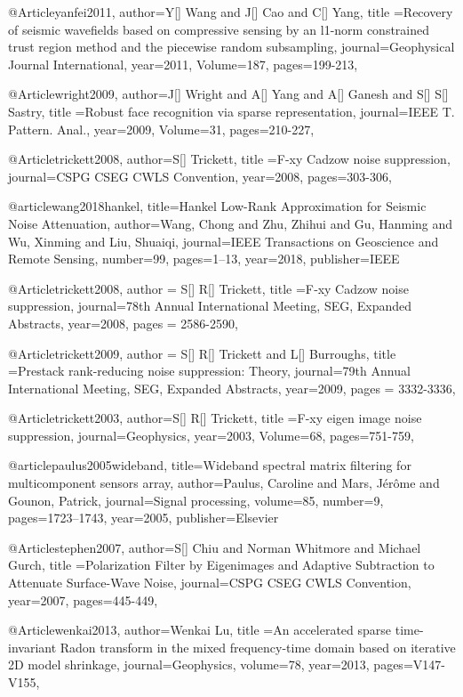 @Article{yanfei2011,
  author={Y[] Wang and J[] Cao and C[] Yang},
  title ={Recovery of seismic wavefields based on compressive sensing by an l1-norm constrained trust region method and the piecewise random subsampling},
  journal={Geophysical Journal International},
  year=2011,
  Volume=187,
  pages={199-213},
}

@Article{wright2009,
  author={J[] Wright and A[] Yang and A[] Ganesh and S[] S[] Sastry},
  title ={Robust face recognition via sparse representation},
  journal={IEEE T. Pattern. Anal.},
  year=2009,
  Volume=31,
  pages={210-227},
}

@Article{trickett2008,
  author={S[] Trickett},
  title ={{F}-xy Cadzow noise suppression},
  journal={CSPG CSEG CWLS Convention},
  year=2008,
  pages={303-306},
}

@article{wang2018hankel,
  title={Hankel Low-Rank Approximation for Seismic Noise Attenuation},
  author={Wang, Chong and Zhu, Zhihui and Gu, Hanming and Wu, Xinming and Liu, Shuaiqi},
  journal={IEEE Transactions on Geoscience and Remote Sensing},
  number={99},
  pages={1--13},
  year={2018},
  publisher={IEEE}
}

@Article{trickett2008,
  author = {S[] R[] Trickett},
  title ={F‐xy Cadzow noise suppression},
  journal={78th Annual International Meeting, SEG, Expanded Abstracts},
  year=2008,
  pages = {2586-2590},
}

@Article{trickett2009,
  author = {S[] R[] Trickett and L[] Burroughs},
  title ={Prestack rank-reducing noise suppression: Theory},
  journal={79th Annual International Meeting, SEG, Expanded Abstracts},
  year=2009,
  pages = {3332-3336},
}

@Article{trickett2003,
  author={S[] R[] Trickett},
  title ={F-xy eigen image noise suppression},
  journal={Geophysics},
  year=2003,
  Volume=68,
  pages={751-759},
}

@article{paulus2005wideband,
  title={Wideband spectral matrix filtering for multicomponent sensors array},
  author={Paulus, Caroline and Mars, J{\'e}r{\^o}me and Gounon, Patrick},
  journal={Signal processing},
  volume={85},
  number={9},
  pages={1723--1743},
  year={2005},
  publisher={Elsevier}
}


@Article{stephen2007,
  author={S[] Chiu and Norman Whitmore and Michael Gurch},
  title ={Polarization Filter by Eigenimages and Adaptive Subtraction to Attenuate Surface-Wave Noise},
  journal={CSPG CSEG CWLS Convention},
  year=2007,
  pages={445-449},
}

@Article{wenkai2013,
  author={Wenkai Lu},
  title ={An accelerated sparse time-invariant Radon transform in the mixed frequency-time domain based on iterative 2{D} model shrinkage},
  journal={Geophysics},
  volume=78,
  year=2013,
  pages={V147-V155},
}

